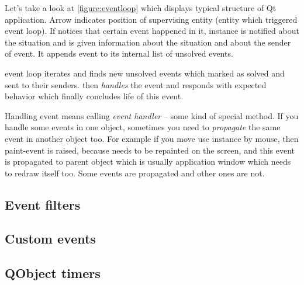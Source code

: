 Let's take a look at \autoref{figure:eventloop} which displays typical structure of Qt application.  Arrow indicates position of supervising entity (entity which triggered event loop). If notices that certain event happened in it, instance is notified about the situation and is given information about the situation and about the sender of event. It appends event to its internal list of unsolved events.

 event loop iterates and finds new unsolved events which marked as solved and sent to their senders. then \textit{handles} the event and responds with expected behavior which finally concludes life of this event.

Handling event means calling \textit{event handler} -- some kind of special method. If you handle some events in one object, sometimes you need to \textit{propagate} the same event in another object too. For example if you move use instance by mouse, then paint-event is raised, because needs to be repainted on the screen, and this event is propagated to parent object which is usually application window which needs to redraw itself too. Some events are propagated and other ones are not.




\subsection{Event filters}

\subsection{Custom events}

\subsection{QObject timers}